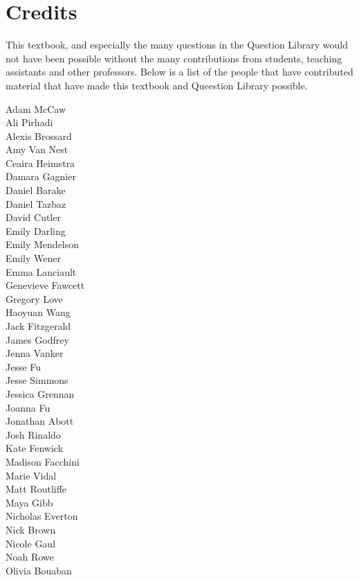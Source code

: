 \section*{Credits}
This textbook, and especially the many questions in the Question Library would not have been possible without the many contributions from students, teaching assistants and other professors. Below is a list of the people that have contributed material that have made this textbook and Queestion Library possible. 

\begin{multicols}{3}
\begin{center}
Adam McCaw\\
Ali Pirhadi\\
Alexis Brossard\\
Amy Van Nest\\
Ceaira Heimstra\\
Damara Gagnier\\
Daniel Barake \\
Daniel Tazbaz\\
David Cutler\\
Emily Darling\\
Emily Mendelson\\
Emily Wener\\
Emma Lanciault\\
Genevieve Fawcett\\
Gregory Love\\
Haoyuan Wang\\
Jack Fitzgerald\\
James Godfrey\\
Jenna Vanker\\
\columnbreak
Jesse Fu\\
Jesse Simmons\\
Jessica Grennan\\
Joanna Fu\\
Jonathan Abott\\
Josh Rinaldo\\
Kate Fenwick\\
Madison Facchini\\
Marie Vidal\\
Matt Routliffe\\
Maya Gibb\\
Nicholas Everton\\
Nick Brown\\
Nicole Gaul\\
Noah Rowe\\
Olivia Bouaban\\

\end{center}
\end{multicols}
